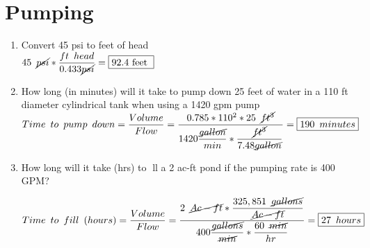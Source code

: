 \documentclass{article}
\begin{document}
\section{Pumping}
\begin{enumerate}
\item Convert 45 psi to feet of head\\

 
$
45 \enspace \cancel{psi}*\dfrac{ft \enspace head}{0.433\cancel{psi}}=\boxed{92.4 \text { feet }}
$
 
 \vspace{0.2cm}
 
\item How long (in minutes) will it take to pump down 25 feet of water in a 110 ft diameter cylindrical tank when using a 1420 gpm pump\\
  
  $Time \enspace to \enspace pump \enspace down= \dfrac{Volume}{Flow}=\dfrac{0.785*110^2*25 \enspace \cancel{ft^3}}{1420\dfrac{\cancel{gallon}}{min}*\dfrac{\cancel{ft^3}}{7.48\cancel{gallon}}}=\boxed{190 \enspace minutes}$
 
 \vspace{0.2cm}

\item How long will it take (hrs) to ll a 2 ac-ft pond if the pumping rate is 400 GPM?

 
 \vspace{0.2cm}
 
 $Time \enspace to \enspace fill \enspace(hours)= \dfrac{Volume}{Flow}=\dfrac{2 \enspace \cancel{Ac-ft}*\dfrac{325,851 \enspace \cancel{gallons}}{\cancel{Ac-ft}}}{400 \dfrac{\cancel{gallons}}{\cancel{min}}*\dfrac{60 \enspace\cancel{ min}}{hr}}=\boxed{27 \enspace hours}$
\end{enumerate}
\end{document}
